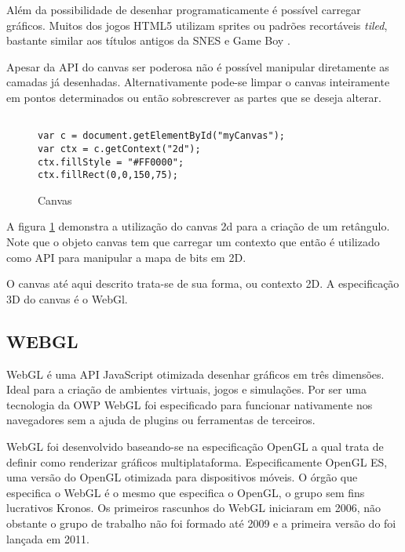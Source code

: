 Além da possibilidade de desenhar programaticamente é possível
carregar gráficos. Muitos dos jogos HTML5 utilizam sprites ou padrões
recortáveis \textit{tiled}, bastante similar aos títulos antigos da
SNES e Game Boy \autocite{buildingHtml5Game}.

Apesar da API do canvas ser poderosa não é possível manipular
diretamente as camadas já desenhadas. Alternativamente pode-se limpar
o canvas inteiramente em pontos determinados ou então sobrescrever as
partes que se deseja alterar.

\begin{figure}[H]
\centering
\begin{verbatim}

var c = document.getElementById("myCanvas");
var ctx = c.getContext("2d");
ctx.fillStyle = "#FF0000";
ctx.fillRect(0,0,150,75);

\end{verbatim}
\caption{Canvas}
\label{img:retangleOnCanvas}
\end{figure}

A figura \ref{img:retangleOnCanvas} demonstra a utilização do canvas 2d
para a criação de um retângulo. Note que o objeto canvas tem que carregar um
contexto que então é utilizado como API para manipular a mapa de bits em 2D.

O canvas até aqui descrito trata-se de sua forma, ou contexto 2D. A
especificação 3D do canvas é o WebGl.

\subsection{WEBGL}

WebGL é uma API JavaScript otimizada desenhar gráficos em três
dimensões. Ideal para a criação de ambientes virtuais, jogos e
simulações. Por ser uma tecnologia da OWP WebGL foi especificado
para funcionar nativamente nos navegadores sem a ajuda de plugins ou
ferramentas de terceiros.

WebGL foi desenvolvido baseando-se na especificação OpenGL a
qual trata de definir como renderizar gráficos multiplataforma.
Especificamente OpenGL ES, uma versão do OpenGL otimizada para
dispositivos móveis. O órgão que especifica o WebGL é o mesmo que
especifica o OpenGL, o grupo sem fins lucrativos Kronos. Os primeiros
rascunhos do WebGL iniciaram em 2006, não obstante o grupo de trabalho
não foi formado até 2009 e a primeira versão do foi lançada em 2011.


